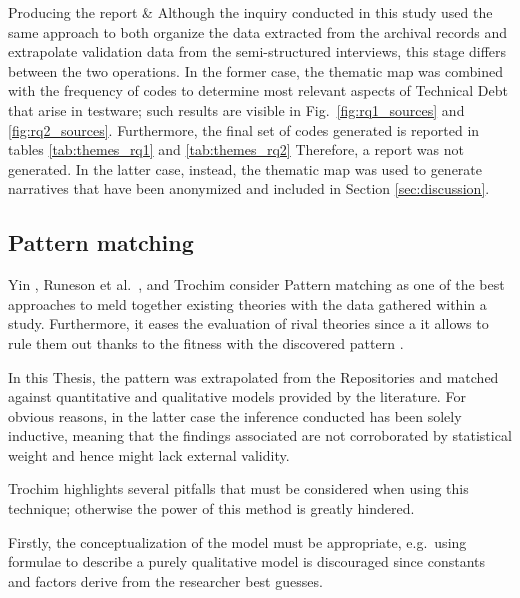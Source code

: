 \begin{longtabu}
    Producing the report &
    Although the inquiry conducted in this study used the same approach to both organize the data extracted from the archival records and extrapolate validation data from the semi-structured interviews, this stage differs between the two operations. In the former case, the thematic map was combined with the frequency of codes to determine most relevant aspects of Technical Debt that arise in testware; such results are visible in Fig.\ \ref{fig:rq1_sources} and \ref{fig:rq2_sources}. Furthermore, the final set of codes generated is reported in tables \ref{tab:themes_rq1} and \ref{tab:themes_rq2} Therefore, a report was not generated. In the latter case, instead, the thematic map was used to generate narratives that have been anonymized and included in Section \ref{sec:discussion}.
    \\
    \hline

\caption{Description of steps taken while performing thematic analysis with example of the procedure has been used with real data.}
\label{tab:thematic_analysis_steps}
\end{longtabu}



\subsection{Pattern matching} \label{sec:pattern-matching}
Yin \cite{case_study_guide}, Runeson et al.\ \cite{case_study_software_engineering}, and Trochim \cite{pattern_matching} consider Pattern matching as one of the best approaches to meld together existing theories with the data gathered within a study. Furthermore, it eases the evaluation of rival theories since a it allows to rule them out thanks to the fitness with the discovered pattern \cite{pattern_matching}.

In this Thesis, the pattern was extrapolated from the Repositories and matched against quantitative and qualitative models provided by the literature. For obvious reasons, in the latter case the inference conducted has been solely inductive, meaning that the findings associated are not corroborated by statistical weight and hence might lack external validity.

Trochim \cite{pattern_matching} highlights several pitfalls that must be considered when using this technique; otherwise the power of this method is greatly hindered.

Firstly, the conceptualization of the model must be appropriate, e.g.\ using formulae to describe a purely qualitative model is discouraged since constants and factors derive from the researcher best guesses.


